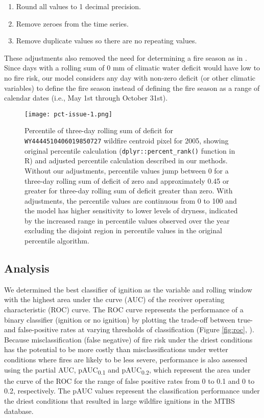\documentclass[11p]{article}
\newcommand{\pauc}[1]{pAUC\textsubscript{#1}}
\begin{document}
\begin{table}
{\begin{enumerate}
\item Round all values to 1 decimal precision.
\item Remove zeroes from the time series.
\item Remove duplicate values so there are no repeating values.
\end{enumerate}
   
These adjustments %
also removed the need for determining a fire season as in \citet{thomaWaterBalanceIndicator2020}. Since days with a rolling sum of 0 mm of climatic water deficit would have low to no fire risk, our model considers any day with non-zero deficit (or other climatic variables) to define the fire season instead of defining the fire season as a range of calendar dates (i.e., May 1st through October 31st).

\begin{figure}[htbp]
  \centering
  \texttt{[image: pct-issue-1.png]}
  \caption{Percentile of three-day rolling sum of deficit for \texttt{WY4444510406019850727} wildfire centroid pixel for 2005, showing original percentile calculation (\texttt{dplyr::percent\_rank()} function in R) and adjusted percentile calculation described in our methods. Without our adjustments, percentile values jump between 0 for a three-day rolling sum of deficit of zero and approximately 0.45 or greater for three-day rolling sum of deficit greater than zero. With adjustments, the percentile values are continuous from 0 to 100 and the model has higher sensitivity to lower levels of dryness, indicated by the increased range in percentile values observed over the year excluding the disjoint region in percentile values in the original percentile algorithm.}
  \label{fig:pct-issue}
\end{figure}

\subsection{Analysis}

We determined the best classifier of ignition as the variable and rolling window with the highest area under the curve (AUC) of the receiver operating characteristic (ROC) curve. The ROC curve represents the performance of a binary classifier (ignition or no ignition) by plotting the trade-off between true- and false-positive rates at varying thresholds of classification (Figure \ref{fig:roc}, \citet{pontiusRecommendationsUsingRelative2014}). Because misclassification (false negative) of fire risk under the driest conditions has the potential to be more costly than misclassifications under wetter conditions where fires are likely to be less severe, performance is also assessed using the partial AUC, \pauc{0.1} and \pauc{0.2}, which represent the area under the curve of the ROC for the range of false positive rates from 0 to 0.1 and 0 to 0.2, respectively. The pAUC values represent the classification performance under the driest conditions that resulted in large wildfire ignitions in the MTBS database.

}
\end{table}
\end{document}
